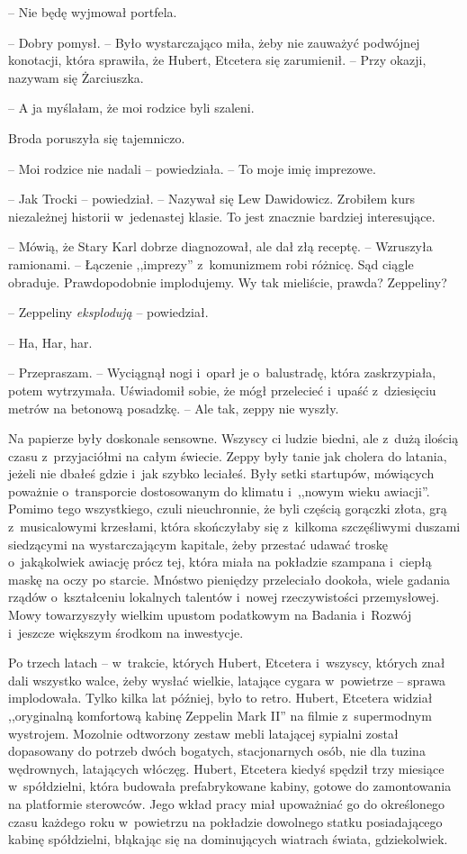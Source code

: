 \documentclass[oneside,polish,11pt,sfheadings]{mwbk}
\begin{document}
-- Nie będę wyjmował portfela.

-- Dobry pomysł. -- Było wystarczająco miła, żeby nie zauważyć podwójnej
konotacji, która sprawiła, że Hubert, Etcetera się zarumienił. -- Przy
okazji, nazywam się Żarciuszka.

-- A ja myślałam, że moi rodzice byli szaleni.

Broda poruszyła się tajemniczo. 

-- Moi rodzice nie nadali -- powiedziała. -- To moje imię imprezowe.

-- Jak Trocki -- powiedział. -- Nazywał się Lew Dawidowicz. Zrobiłem kurs
niezależnej historii w~jedenastej klasie. To jest znacznie bardziej
interesujące.

-- Mówią, że Stary Karl dobrze diagnozował, ale dał złą receptę. -- Wzruszyła ramionami. -- Łączenie ,,imprezy'' z~komunizmem robi różnicę.
Sąd ciągle obraduje. Prawdopodobnie implodujemy. Wy tak mieliście,
prawda? Zeppeliny?

-- Zeppeliny \textit{eksplodują} -- powiedział.

-- Ha, Har, har.

-- Przepraszam. -- Wyciągnął nogi i~oparł je o~balustradę, która
zaskrzypiała, potem wytrzymała. Uświadomił sobie, że mógł przelecieć i~upaść z~dziesięciu metrów na betonową posadzkę. -- Ale tak, zeppy nie
wyszły. 

Na papierze były doskonale sensowne. Wszyscy ci ludzie biedni,
ale z~dużą ilością czasu z~przyjaciółmi na całym świecie. Zeppy były
tanie jak cholera do latania, jeżeli nie dbałeś gdzie i~jak szybko
leciałeś. Były setki startupów, mówiących poważnie o~transporcie
dostosowanym do klimatu i~,,nowym wieku awiacji''. Pomimo tego
wszystkiego, czuli nieuchronnie, że byli częścią gorączki złota, grą z~musicalowymi krzesłami, która skończyłaby się z~kilkoma szczęśliwymi
duszami siedzącymi na wystarczającym kapitale, żeby przestać udawać
troskę o~jakąkolwiek awiację prócz tej, która miała na pokładzie
szampana i~ciepłą maskę na oczy po starcie. Mnóstwo pieniędzy
przeleciało dookoła, wiele gadania rządów o~kształceniu lokalnych
talentów i~nowej rzeczywistości przemysłowej. Mowy towarzyszyły wielkim
upustom podatkowym na Badania i~Rozwój i~jeszcze większym środkom na
inwestycje.

Po trzech latach -- w~trakcie, których Hubert, Etcetera i~wszyscy,
których znał dali wszystko walce, żeby wysłać wielkie, latające cygara w~powietrze -- sprawa implodowała. Tylko kilka lat później, było to retro.
Hubert, Etcetera widział ,,oryginalną komfortową kabinę Zeppelin Mark
II'' na filmie z~supermodnym wystrojem. Mozolnie odtworzony zestaw mebli
latającej sypialni został dopasowany do potrzeb dwóch bogatych,
stacjonarnych osób, nie dla tuzina wędrownych, latających włóczęg.
Hubert, Etcetera kiedyś spędził trzy miesiące w~spółdzielni, która
budowała prefabrykowane kabiny, gotowe do zamontowania na platformie
sterowców. Jego wkład pracy miał upoważniać go do określonego czasu
każdego roku w~powietrzu na pokładzie dowolnego statku posiadającego
kabinę spółdzielni, błąkając się na dominujących wiatrach świata,
gdziekolwiek.
\end{document}
